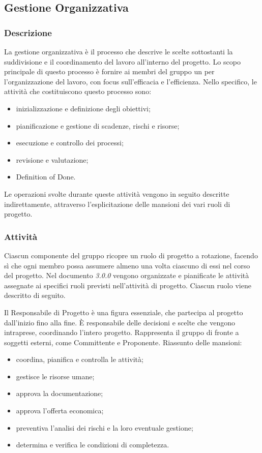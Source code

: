\subsection{Gestione Organizzativa}

		\subsubsection{Descrizione}
			La gestione organizzativa è il processo che descrive le scelte sottostanti la suddivisione e il coordinamento del lavoro all'interno del progetto. Lo scopo principale di questo processo è fornire ai membri del gruppo un \PdP{} per l'organizzazione del lavoro, con focus sull'efficacia e l'efficienza. Nello specifico, le attività che costituiscono questo processo sono:
			\begin{itemize}
				\item {inizializzazione e definizione degli obiettivi;}
				\item {pianificazione e gestione di scadenze, rischi e risorse;}
				\item {esecuzione e controllo dei processi;}
				\item {revisione e valutazione;}
				\item {Definition of Done.}
			\end{itemize}
			Le operazioni svolte durante queste attività vengono in seguito descritte indirettamente, attraverso l'esplicitazione delle mansioni dei vari ruoli di progetto.
			\subsubsection{Attività}
			Ciascun componente del gruppo ricopre un ruolo di progetto a rotazione, facendo sì che ogni membro possa assumere almeno una volta ciascuno di essi nel corso del progetto. Nel documento \PdP{} \textit{3.0.0} vengono organizzate e pianificate le attività assegnate ai specifici ruoli previsti nell'attività di progetto. Ciascun ruolo viene descritto di seguito.

			Il Responsabile di Progetto è una figura essenziale, che partecipa al progetto dall'inizio fino alla fine. È responsabile delle decisioni e scelte che vengono intraprese, coordinando l'intero progetto. Rappresenta il gruppo di fronte a soggetti esterni, come Committente e Proponente.
			Riassunto delle mansioni:
			\begin{itemize}
				\item coordina, pianifica e controlla le attività;
				\item gestisce le risorse umane;
				\item approva la documentazione;
				\item approva l'offerta economica;
				\item preventiva l'analisi dei rischi e la loro eventuale gestione;
				\item determina e verifica le condizioni di completezza.
			\end{itemize}

